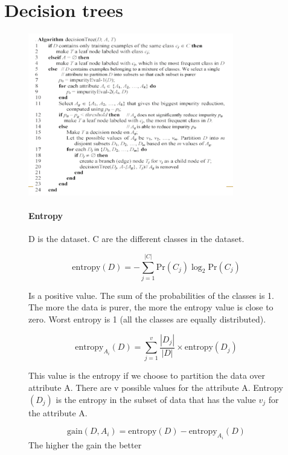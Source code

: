 \documentclass[10pt,oneside,a4paper]{article}
\begin{document}
\section{Decision trees}
\begin{figure}[h!]
    \centering
    \begin{minipage}{0.5\textwidth}
        \centering
        \includegraphics[width=0.8\textwidth]{Images/DecisionTree.png}
    \end{minipage}%
    \hfill %
    \begin{minipage}{0.5\textwidth}
        \paragraph{Entropy}
        D is the dataset. C are the different classes in the dataset.

        \[
            \text{entropy}(D) = - \sum_{j=1}^{|C|} \text{Pr}(C_j) \log_2 \text{Pr}(C_j)
        \]

        Is a positive value.
        The sum of the probabilities of the classes is 1.
        The more the data is purer, the more the entropy value is close to zero.
        Worst entropy is 1 (all the classes are equally distributed).

        \[
            \text{entropy}_{A_i}(D) = \sum_{j=1}^{v} \frac{|D_j|}{|D|} \times \text{entropy}(D_j)
        \]

        This value is the entropy if we choose to partition the data over attribute A. There are v possible values for the attribute A.
        Entropy$(D_j)$ is the entropy in the subset of data that has the value $v_j$ for the attribute A.

        \[
            \text{gain}(D, A_i) = \text{entropy}(D) - \text{entropy}_{A_i}(D)
        \]
        The higher the gain the better

    \end{minipage}
\end{figure}
\end{document}
